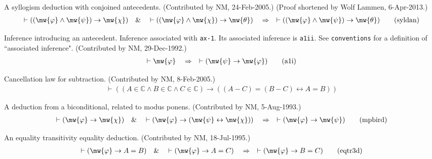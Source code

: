 \begin{lemma} A syllogism deduction with conjoined
antecedents.  (Contributed by NM,
       24-Feb-2005.)  (Proof shortened by Wolf Lammen, 6-Apr-2013.)
\begin{align}
\vdash ( ( \mw{\varphi} \wedge \mw{\psi} ) \rightarrow \mw{\chi} )\quad\&\quad
    \vdash ( ( \mw{\varphi} \wedge \mw{\chi} ) \rightarrow \mw{\theta}
    )\quad\Rightarrow\quad \vdash ( ( \mw{\varphi} \wedge \mw{\psi} )
    \rightarrow \mw{\theta} )\label{eq:syldan}\tag{syldan}
\end{align}
\end{lemma}


\begin{lemma} Inference introducing an antecedent.  Inference
associated with {\tt ax-1}.
       Its associated inference is {\tt a1ii}.  See {\tt conventions} for a
definition
       of ``associated inference".  (Contributed by NM, 29-Dec-1992.)
\begin{align}
\vdash \mw{\varphi}\quad\Rightarrow\quad \vdash ( \mw{\psi} \rightarrow
    \mw{\varphi} )\label{eq:a1i}\tag{a1i}
\end{align}
\end{lemma}


\begin{lemma} Cancellation law for subtraction. 
(Contributed by NM, 8-Feb-2005.)
\begin{align}
\vdash ( ( A \in \mathbb{C} \wedge B \in \mathbb{C} \wedge C \in \mathbb{C} )
    \rightarrow ( ( A \minus C ) = ( B \minus C ) \leftrightarrow A = B )
    )\label{eq:subcan2}\tag{subcan2}
\end{align}
\end{lemma}


\begin{lemma} A deduction from a biconditional, related to
modus ponens.  (Contributed
       by NM, 5-Aug-1993.)
\begin{align}
\vdash ( \mw{\varphi} \rightarrow \mw{\chi} )\quad\&\quad \vdash ( \mw{\varphi}
    \rightarrow ( \mw{\psi} \leftrightarrow \mw{\chi} ) )\quad\Rightarrow\quad
    \vdash ( \mw{\varphi} \rightarrow \mw{\psi} )\label{eq:mpbird}\tag{mpbird}
\end{align}
\end{lemma}


\begin{lemma} An equality transitivity equality deduction.
(Contributed by NM,
       18-Jul-1995.)
\begin{align}
\vdash ( \mw{\varphi} \rightarrow A = B )\quad\&\quad \vdash ( \mw{\varphi}
    \rightarrow A = C )\quad\Rightarrow\quad \vdash ( \mw{\varphi} \rightarrow
    B = C )\label{eq:eqtr3d}\tag{eqtr3d}
\end{align}
\end{lemma}


